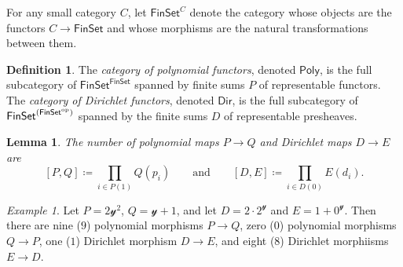 \documentclass[11pt, article, one side]{memoir}
\theoremstyle{theorem}
\newtheorem{lemma}[equation]{Lemma}
\theoremstyle{definition}
\newtheorem{definition}[equation]{Definition}
\theoremstyle{remark}
\newtheorem{example}[equation]{Example}
\newcommand{\Cat}[1]{\mathsf{#1}}%
\newcommand{\op}{^\tn{op}}
\newcommand{\tn}[1]{\textnormal{#1}}
\newcommand{\finset}{\Cat{FinSet}}
\newcommand{\yon}{\mathcal{y}}
\newcommand{\poly}{\Cat{Poly}}
\newcommand{\dir}{\Cat{Dir}}
\newcommand{\qqand}{\qquad\text{and}\qquad}
\begin{document}
For any small category $C$, let $\finset^C$ denote the category whose objects are the functors $C\to\finset$ and whose morphisms are the natural transformations between them.

\begin{definition}\label{def.poly_dir}
The \emph{category of polynomial functors}, denoted $\poly$, is the full subcategory of $\finset^\finset$ spanned by finite sums $P$ of representable functors. The \emph{category of Dirichlet functors}, denoted $\dir$, is the full subcategory of $\finset^{(\finset\op)}$ spanned by the finite sums $D$ of representable presheaves.
\end{definition}

\begin{lemma}
The number of polynomial maps $P\to Q$ and Dirichlet maps $D\to E$ are
\[
  [P, Q]\coloneqq\prod_{i\in P(1)}Q(p_i)
  \qqand
  [D, E]\coloneqq\prod_{i\in D(0)}E(d_i).
\]
\end{lemma}

\begin{example}
Let $P=2\yon^2$, $Q=\yon+1$, and let $D=2\cdot2^\yon$ and $E=1+0^\yon$. Then there are nine ($9$) polynomial morphisms $P\to Q$, zero ($0$) polynomial morphisms $Q\to P$, one ($1$) Dirichlet morphism $D\to E$, and eight ($8$) Dirichlet morphiisms $E\to D$.
\end{example}
\end{document}
